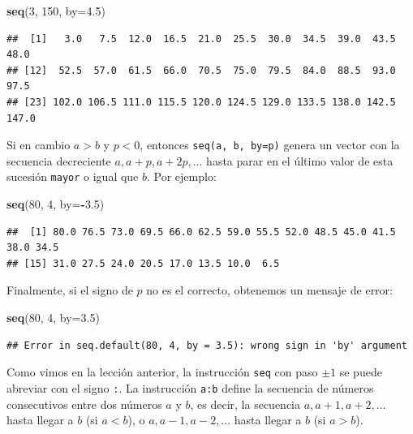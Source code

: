 \documentclass[]{book}
\newenvironment{Shaded}{\begin{snugshade}}{\end{snugshade}}
\newcommand{\DataTypeTok}[1]{\textcolor[rgb]{0.13,0.29,0.53}{#1}}
\newcommand{\DecValTok}[1]{\textcolor[rgb]{0.00,0.00,0.81}{#1}}
\newcommand{\FloatTok}[1]{\textcolor[rgb]{0.00,0.00,0.81}{#1}}
\newcommand{\KeywordTok}[1]{\textcolor[rgb]{0.13,0.29,0.53}{\textbf{#1}}}
\newcommand{\NormalTok}[1]{#1}
\newcommand{\OperatorTok}[1]{\textcolor[rgb]{0.81,0.36,0.00}{\textbf{#1}}}
\theoremstyle{definition}
\theoremstyle{definition}
\theoremstyle{definition}
\theoremstyle{remark}
\begin{document}
\begin{Shaded}
\begin{Highlighting}[]
\KeywordTok{seq}\NormalTok{(}\DecValTok{3}\NormalTok{, }\DecValTok{150}\NormalTok{, }\DataTypeTok{by=}\FloatTok{4.5}\NormalTok{)}
\end{Highlighting}
\end{Shaded}

\begin{verbatim}
##  [1]   3.0   7.5  12.0  16.5  21.0  25.5  30.0  34.5  39.0  43.5  48.0
## [12]  52.5  57.0  61.5  66.0  70.5  75.0  79.5  84.0  88.5  93.0  97.5
## [23] 102.0 106.5 111.0 115.5 120.0 124.5 129.0 133.5 138.0 142.5 147.0
\end{verbatim}

Si en cambio \(a>b\) y \(p<0\), entonces \texttt{seq(a,\ b,\ by=p)} genera un vector con la secuencia decreciente \(a,a+p, a+2p, \ldots\)
hasta parar en el último valor de esta sucesión \texttt{mayor} o igual que \(b\). Por ejemplo:

\begin{Shaded}
\begin{Highlighting}[]
\KeywordTok{seq}\NormalTok{(}\DecValTok{80}\NormalTok{, }\DecValTok{4}\NormalTok{, }\DataTypeTok{by=}\OperatorTok{-}\FloatTok{3.5}\NormalTok{)}
\end{Highlighting}
\end{Shaded}

\begin{verbatim}
##  [1] 80.0 76.5 73.0 69.5 66.0 62.5 59.0 55.5 52.0 48.5 45.0 41.5 38.0 34.5
## [15] 31.0 27.5 24.0 20.5 17.0 13.5 10.0  6.5
\end{verbatim}

Finalmente, si el signo de \(p\) no es el correcto, obtenemos un mensaje de error:

\begin{Shaded}
\begin{Highlighting}[]
\KeywordTok{seq}\NormalTok{(}\DecValTok{80}\NormalTok{, }\DecValTok{4}\NormalTok{, }\DataTypeTok{by=}\FloatTok{3.5}\NormalTok{)}
\end{Highlighting}
\end{Shaded}

\begin{verbatim}
## Error in seq.default(80, 4, by = 3.5): wrong sign in 'by' argument
\end{verbatim}

Como vimos en la lección anterior, la instrucción \texttt{seq} con paso \(\pm 1\) se puede abreviar con el signo \texttt{:}. La instrucción \texttt{a:b} define la secuencia de números consecutivos entre dos números \(a\) y \(b\), es decir, la secuencia \(a, a+1, a+2, \ldots\) hasta llegar a \(b\) (si \(a< b\)), o \(a, a-1, a-2, \ldots\) hasta llegar a \(b\) (si \(a> b\)).
\end{document}
